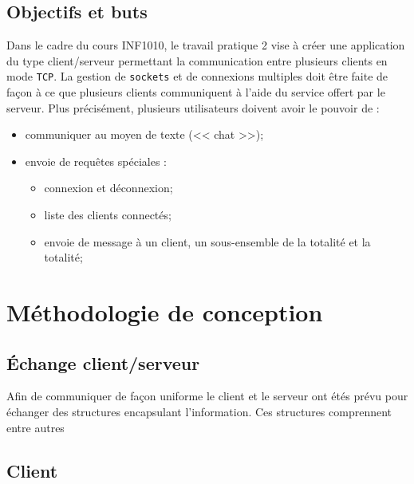 \documentclass[12pt,french]{article}
\begin{document}
        \subsection{Objectifs et buts} %
        \label{sub:obj-buts}
            Dans le cadre du cours INF1010, le travail pratique 2 vise à créer une application du type
            client/serveur permettant la communication entre plusieurs clients en mode {\tt TCP}. La
            gestion de {\tt sockets} et de connexions multiples doit être faite de façon à ce que
            plusieurs clients communiquent à l'aide du service offert par le serveur. Plus précisément,
            plusieurs utilisateurs doivent avoir le pouvoir de :
            \begin{itemize}
                \item communiquer au moyen de texte (<< chat >>);
                \item envoie de requêtes spéciales :
                    \begin{itemize}
                        \item connexion et déconnexion;
                        \item liste des clients connectés;
                        \item envoie de message à un client, un sous-ensemble de la totalité et la
                            totalité;
                    \end{itemize}
            \end{itemize}

    \section{Méthodologie de conception} %
    \label{sec:method-concept}

        \subsection{Échange client/serveur} %
        \label{sub:echange client/serveur}
            Afin de communiquer de façon uniforme le client et le serveur ont étés prévu pour
            échanger des structures encapsulant l'information. Ces structures comprennent entre
            autres 

        \subsection{Client} %
        \label{sub:client}
\end{document}
